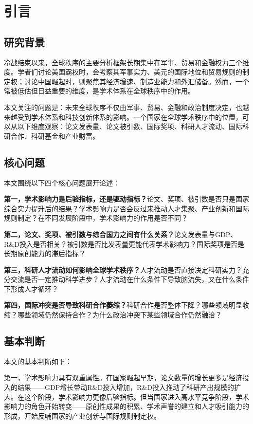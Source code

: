 \section{引言}

\subsection{研究背景}

\noindent 冷战结束以来，全球秩序的主要分析框架长期集中在军事、贸易和金融权力三个维度。学者们讨论美国霸权时，会考察其军事实力、美元的国际地位和贸易规则的制定权；讨论中国崛起时，则聚焦其经济增速、制造业能力和外汇储备。然而，一个常被低估但日益重要的维度，是学术体系在全球秩序中的作用。

本文关注的问题是：未来全球秩序不仅由军事、贸易、金融和政治制度决定，也越来越受到学术体系和科技创新体系的影响。一个国家在全球学术秩序中的位置，可以从以下维度观察：论文发表量、论文被引数、国际奖项、科研人才流动、国际科研合作、科研基金和产业财富。

\subsection{核心问题}

本文围绕以下四个核心问题展开论述：

\textbf{第一，学术影响力是后验指标，还是驱动指标？}论文、奖项、被引数是否只是国家综合实力提升后的结果？学术影响力是否会反过来推动人才集聚、产业创新和国际规则制定？在不同发展阶段中，学术影响力的作用是否不同？

\textbf{第二，论文、奖项、被引数与综合国力之间有什么关系？}论文发表量与GDP、R\&D投入是否相关？被引数是否比发表量更能代表学术影响力？国际奖项是否是长期原创能力的滞后指标？

\textbf{第三，科研人才流动如何影响全球学术秩序？}人才流动是否直接决定科研实力？充分交流是否一定推动科学进步？人才流动在什么条件下导致脑流失，又在什么条件下形成人才循环？

\textbf{第四，国际冲突是否导致科研合作萎缩？}科研合作是否整体下降？哪些领域明显收缩？哪些领域仍然保持合作？为什么政治冲突下某些领域合作仍然融洽？

\subsection{基本判断}

本文的基本判断如下：

第一，学术影响力具有双重属性。在国家崛起早期，论文数量的增长更多是经济投入的结果——GDP增长带动R\&D投入增加，R\&D投入推动了科研产出规模的扩大。在这个阶段，学术影响力更像后验指标。但当国家进入高水平竞争阶段，学术影响力的角色开始转变——原创性成果的积累、学术声誉的建立和人才吸引能力的形成，开始反哺国家的产业创新与国际规则制定权。

